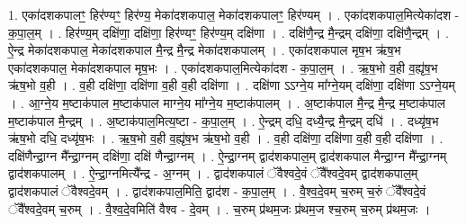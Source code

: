 \documentclass[17pt]{extarticle}
\begin{document}
1. एका॑दशकपालꣳ॒॒ हिर॑ण्यꣳ॒॒ हिर॑ण्य॒ मेका॑दशकपाल॒ मेका॑दशकपालꣳ॒॒ हिर॑ण्यम् । . एका॑दशकपाल॒मित्येका॑दश - क॒पा॒ल॒म् । . हिर॑ण्य॒म् दक्षि॑णा॒ दक्षि॑णा॒ हिर॑ण्यꣳ॒॒ हिर॑ण्य॒म् दक्षि॑णा । . दक्षि॑णै॒न्द्र मै॒न्द्रम् दक्षि॑णा॒ दक्षि॑णै॒न्द्रम् । . ऐ॒न्द्र मेका॑दशकपाल॒ मेका॑दशकपाल मै॒न्द्र मै॒न्द्र मेका॑दशकपालम् । . एका॑दशकपाल मृष॒भ ऋ॑ष॒भ एका॑दशकपाल॒ मेका॑दशकपाल मृष॒भः । . एका॑दशकपाल॒मित्येका॑दश - क॒पा॒ल॒म् । . ऋ॒ष॒भो व॒ही व॒ह्यृ॑ष॒भ ऋ॑ष॒भो व॒ही । . व॒ही दक्षि॑णा॒ दक्षि॑णा व॒ही व॒ही दक्षि॑णा । . दक्षि॑णा ऽऽग्ने॒य मा᳚ग्ने॒यम् दक्षि॑णा॒ दक्षि॑णा ऽऽग्ने॒यम् । . आ॒ग्ने॒य म॒ष्टाक॑पाल म॒ष्टाक॑पाल माग्ने॒य मा᳚ग्ने॒य म॒ष्टाक॑पालम् । . अ॒ष्टाक॑पाल मै॒न्द्र मै॒न्द्र म॒ष्टाक॑पाल म॒ष्टाक॑पाल मै॒न्द्रम् । . अ॒ष्टाक॑पाल॒मित्य॒ष्टा - क॒पा॒ल॒म् । . ऐ॒न्द्रम् दधि॒ दध्यै॒न्द्र मै॒न्द्रम् दधि॑ । . दध्यृ॑ष॒भ ऋ॑ष॒भो दधि॒ दध्यृ॑ष॒भः । . ऋ॒ष॒भो व॒ही व॒ह्यृ॑ष॒भ ऋ॑ष॒भो व॒ही । . व॒ही दक्षि॑णा॒ दक्षि॑णा व॒ही व॒ही दक्षि॑णा । . दक्षि॑णैन्द्रा॒ग्न मै᳚न्द्रा॒ग्नम् दक्षि॑णा॒ दक्षि॑ णैन्द्रा॒ग्नम् । . ऐ॒न्द्रा॒ग्नम् द्वाद॑शकपाल॒म् द्वाद॑शकपाल मैन्द्रा॒ग्न मै᳚न्द्रा॒ग्नम् द्वाद॑शकपालम् । . ऐ॒न्द्रा॒ग्नमित्यै᳚न्द्र - अ॒ग्नम् । . द्वाद॑शकपालं ॅवैश्वदे॒वं ॅवै᳚श्वदे॒वम् द्वाद॑शकपाल॒म् द्वाद॑शकपालं ॅवैश्वदे॒वम् । . द्वाद॑शकपाल॒मिति॒ द्वाद॑श - क॒पा॒ल॒म् । . वै॒श्व॒दे॒वम् च॒रुम् च॒रुं ॅवै᳚श्वदे॒वं ॅवै᳚श्वदे॒वम् च॒रुम् । . वै॒श्व॒दे॒वमिति॑ वैश्व - दे॒वम् । . च॒रुम् प्र॑थम॒जः प्र॑थम॒ज श्च॒रुम् च॒रुम् प्र॑थम॒जः । \newline
\end{document}
